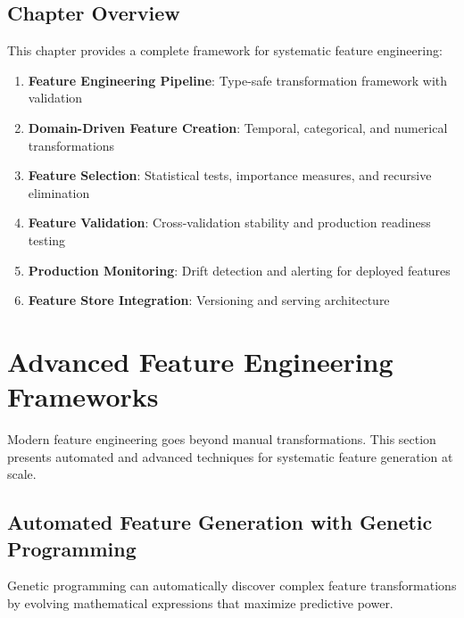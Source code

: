 \subsection{Chapter Overview}

This chapter provides a complete framework for systematic feature engineering:

\begin{enumerate}
    \item \textbf{Feature Engineering Pipeline}: Type-safe transformation framework with validation
    \item \textbf{Domain-Driven Feature Creation}: Temporal, categorical, and numerical transformations
    \item \textbf{Feature Selection}: Statistical tests, importance measures, and recursive elimination
    \item \textbf{Feature Validation}: Cross-validation stability and production readiness testing
    \item \textbf{Production Monitoring}: Drift detection and alerting for deployed features
    \item \textbf{Feature Store Integration}: Versioning and serving architecture
\end{enumerate}

\section{Advanced Feature Engineering Frameworks}

Modern feature engineering goes beyond manual transformations. This section presents automated and advanced techniques for systematic feature generation at scale.

\subsection{Automated Feature Generation with Genetic Programming}

Genetic programming can automatically discover complex feature transformations by evolving mathematical expressions that maximize predictive power.

